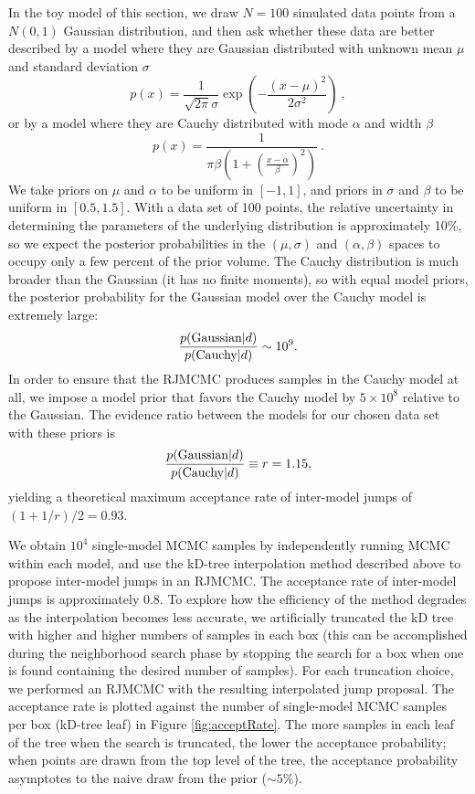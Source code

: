 \documentclass{rsos}
\newcommand{\be}{\begin{equation}}
\newcommand{\ee}{\end{equation}}
\begin{document}
In the toy model of this section, we draw $N = 100$ simulated data
points from a $N(0,1)$ Gaussian distribution, and then ask whether
these data are better described by a model where they are Gaussian
distributed with unknown mean $\mu$ and standard deviation $\sigma$
%
\be
p(x) = \frac{1}{\sqrt{2\pi} \sigma} \exp\left( - \frac{(x-\mu)^2}{2
    \sigma^2} \right)\ ,
\ee
%
or by a model where they are Cauchy distributed with mode $\alpha$
and width $\beta$
%
\be
p(x) = \frac{1}{\pi \beta \left( 1 + \left(\frac{x - \alpha}{\beta}\right)^2\right)}\ .
\ee
%
We take priors on $\mu$ and $\alpha$ to be uniform in $[-1,1]$, and
priors in $\sigma$ and $\beta$ to be uniform in $[0.5, 1.5]$.  With a
data set of 100 points, the relative uncertainty in determining the
parameters of the underlying distribution is approximately 10\%, so we
expect the posterior probabilities in the $(\mu,\sigma)$ and
$(\alpha,\beta)$ spaces to occupy only a few percent of the prior
volume.  The Cauchy distribution is much broader than the Gaussian (it
has no finite moments), so with equal model priors, the posterior
probability for the Gaussian model over the Cauchy model is extremely
large:
%
\be
\frac{p(\textnormal{Gaussian} | d)}{p(\textnormal{Cauchy}|d)} \sim 10^9.
\ee
%
In order to ensure that the RJMCMC produces samples in the Cauchy
model at all, we impose a model prior that favors the Cauchy model by
$5 \times 10^8$ relative to the Gaussian.  The evidence ratio between
the models for our chosen data set with these priors is
%
\be \frac{p(\textnormal{Gaussian} | d)}{p(\textnormal{Cauchy}|d)}
\equiv r = 1.15,
\ee
%
yielding a theoretical maximum acceptance rate of inter-model jumps of
$(1+1/r)/2 = 0.93$.

We obtain $10^4$ single-model MCMC samples by independently running
MCMC within each model, and use the kD-tree interpolation method
described above to propose inter-model jumps in an RJMCMC.  The
acceptance rate of inter-model jumps is approximately 0.8.  To explore
how the efficiency of the method degrades as the interpolation becomes
less accurate, we artificially truncated the kD tree with higher and
higher numbers of samples in each box (this can be accomplished during
the neighborhood search phase by stopping the search for a box when
one is found containing the desired number of samples).  For each
truncation choice, we performed an RJMCMC with the resulting
interpolated jump proposal.  The acceptance rate is plotted against
the number of single-model MCMC samples per box (kD-tree leaf) in
Figure \ref{fig:acceptRate}.  The more samples in each leaf of the tree
when the search is truncated, the lower the acceptance probability;
when points are drawn from the top level of the tree, the acceptance
probability asymptotes to the naive draw from the prior ($\sim 5\%$).
\end{document}
